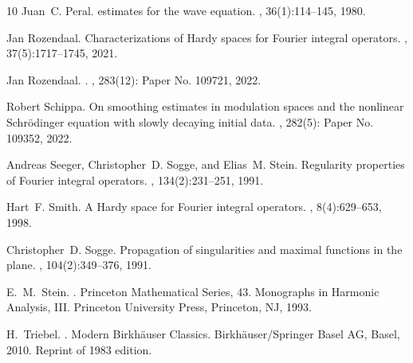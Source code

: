 \documentclass{amsart}
\theoremstyle{definition}
\numberwithin{equation}{section}
\begin{document}
\begin{thebibliography}{10}
Juan~C. Peral.
 estimates for the wave equation.
, 36(1):114--145, 1980.

Jan Rozendaal.
\newblock Characterizations of {H}ardy spaces for {F}ourier integral operators.
, 37(5):1717--1745, 2021.

Jan {Rozendaal}.
.
, 283(12): Paper No. 109721, 2022.


Robert Schippa.
\newblock On smoothing estimates in modulation spaces and the nonlinear
  {S}chr\"{o}dinger equation with slowly decaying initial data.
, 282(5): Paper No. 109352, 2022.


Andreas Seeger, Christopher~D. Sogge, and Elias~M. Stein.
\newblock Regularity properties of {F}ourier integral operators.
, 134(2):231--251, 1991.

Hart~F. Smith.
\newblock A {H}ardy space for {F}ourier integral operators.
, 8(4):629--653, 1998.

Christopher~D. Sogge.
\newblock Propagation of singularities and maximal functions in the plane.
, 104(2):349--376, 1991.


E.~M.~Stein.
.
\newblock Princeton Mathematical Series, 43. Monographs in Harmonic Analysis, III. Princeton University Press, Princeton, NJ, 1993.


H.~Triebel.
.
\newblock Modern Birkh\"auser Classics. Birkh\"auser/Springer Basel AG, Basel,
  2010.
\newblock Reprint of 1983 edition.

\end{thebibliography}
\end{document}
